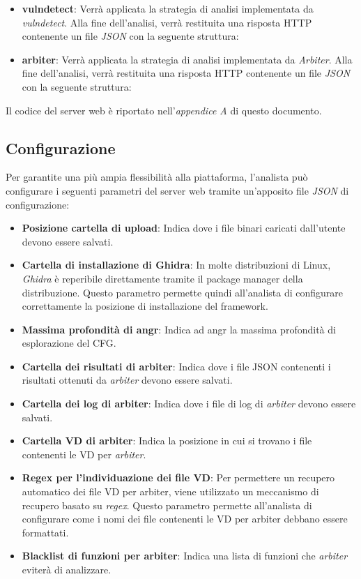 \documentclass[../main.tex]{subfiles}
\begin{document}
\begin{itemize}
    \begin{itemize}
        \item \textbf{vulndetect}: Verrà applicata la strategia di analisi implementata da \textit{vulndetect}. Alla fine dell'analisi, verrà restituita una risposta
        HTTP contenente un file \textit{JSON} con la seguente struttura:
        \noindent
        
        \item \textbf{arbiter}: Verrà applicata la strategia di analisi implementata da \textit{Arbiter}. Alla fine dell'analisi, verrà restituita una risposta
        HTTP contenente un file \textit{JSON} con la seguente struttura:
        
    \end{itemize}
\end{itemize}
Il codice del server web è riportato nell'\textit{appendice A} di questo documento.
\subsection{Configurazione}
Per garantite una più ampia flessibilità alla piattaforma, l'analista può configurare i seguenti parametri
del server web tramite un'apposito file \textit{JSON} di configurazione:
\begin{itemize}
    \item \textbf{Posizione cartella di upload}: Indica dove i file binari caricati dall'utente devono essere salvati.
    \item \textbf{Cartella di installazione di Ghidra}: In molte distribuzioni di Linux, \textit{Ghidra} è reperibile direttamente tramite il package manager della distribuzione.
    Questo parametro permette quindi all'analista di configurare correttamente la posizione di installazione del framework.
    \item \textbf{Massima profondità di angr}: Indica ad angr la massima profondità di esplorazione del CFG.
    \item \textbf{Cartella dei risultati di arbiter}: Indica dove i file JSON contenenti i risultati ottenuti da \textit{arbiter} devono essere salvati.
    \item \textbf{Cartella dei log di arbiter}: Indica dove i file di log di \textit{arbiter} devono essere salvati.
    \item \textbf{Cartella VD di arbiter}: Indica la posizione in cui si trovano i file contenenti le VD per \textit{arbiter}.
    \item \textbf{Regex per l'individuazione dei file VD}: Per permettere un recupero automatico dei file VD per arbiter, viene utilizzato un meccanismo di recupero basato su \textit{regex}.
    Questo parametro permette all'analista di configurare come i nomi dei file contenenti le VD per arbiter debbano essere formattati.
    \item \textbf{Blacklist di funzioni per arbiter}: Indica una lista di funzioni che \textit{arbiter} eviterà di analizzare.
\end{itemize}
\end{document}
